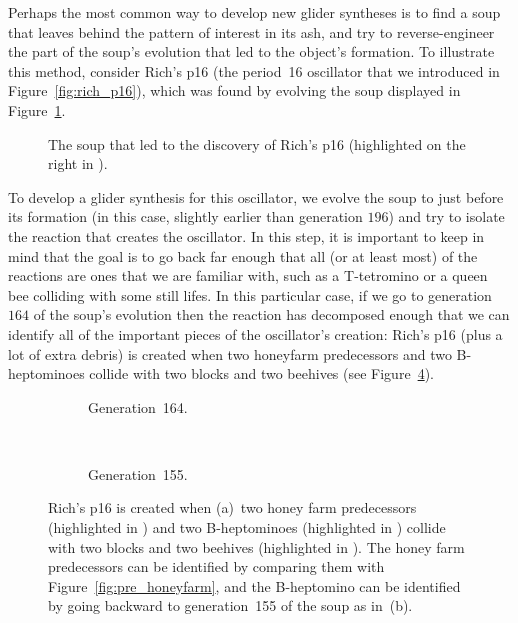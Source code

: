 Perhaps the most common way to develop new glider syntheses is to find a soup that leaves behind the pattern of interest in its ash, and try to reverse-engineer the part of the soup's evolution that led to the object's formation. To illustrate this method, consider Rich's p16 (the period~16 oscillator that we introduced in Figure~\ref{fig:rich_p16}), which was found by evolving the soup displayed in Figure~\ref{fig:richs_p16_soup}.

\begin{figure}[!ht]
	\centering{}
	\caption{The soup that led to the discovery of Rich's p16 (highlighted on the right in ).}\label{fig:richs_p16_soup}
\end{figure}

To develop a glider synthesis for this oscillator, we evolve the soup to just before its formation (in this case, slightly earlier than generation $196$) and try to isolate the reaction that creates the oscillator. In this step, it is important to keep in mind that the goal is to go back far enough that all (or at least most) of the reactions are ones that we are familiar with, such as a T-tetromino or a queen bee colliding with some still lifes. In this particular case, if we go to generation $164$ of the soup's evolution then the reaction has decomposed enough that we can identify all of the important pieces of the oscillator's creation: Rich's p16 (plus a lot of extra debris) is created when two honeyfarm predecessors and two B-heptominoes collide with two blocks and two beehives (see Figure~\ref{fig:richs_p16_soup_detailed}).

\begin{figure}[!ht]
	\centering
	\begin{subfigure}{.48\textwidth}
		\centering{}
		\caption{Generation~164.}\label{fig:richs_p16_soup_164}
	\end{subfigure} \ \ \ \ %
	\begin{subfigure}{.48\textwidth}
		\centering{}
		\caption{Generation~155.}
		\label{fig:richs_p16_soup_155}
	\end{subfigure}
	\caption{Rich's p16 is created when (a)~two honey farm predecessors (highlighted in ) and two B-heptominoes (highlighted in ) collide with two blocks and two beehives (highlighted in ). The honey farm predecessors can be identified by comparing them with Figure~\ref{fig:pre_honeyfarm}, and the B-heptomino can be identified by going backward to generation~155 of the soup as in~(b).}\label{fig:richs_p16_soup_detailed}
\end{figure}

